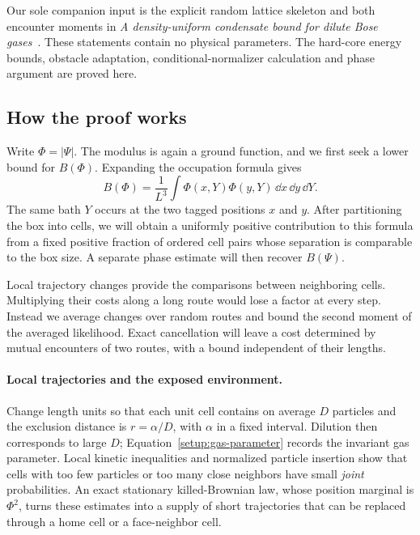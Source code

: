 Our sole companion input is the explicit random lattice skeleton and both
encounter moments in \emph{A density-uniform condensate bound for dilute
Bose gases}~\cite[Section~8.1, pp.~22--24; Lemma~8.1 and
Equations~(24)--(25), p.~23]{SoftCompanion}. These statements contain no
physical parameters. The hard-core energy bounds, obstacle adaptation,
conditional-normalizer calculation and phase argument are proved here.

\subsection{How the proof works}

Write $\Phi=|\Psi|$. The modulus is again a ground function, and we
first seek a lower bound for $B(\Phi)$. Expanding the occupation formula gives
\[
 B(\Phi)=\frac1{L^3}\int\Phi(x,Y)\Phi(y,Y)\,\dd x\,\dd y\,\dd Y.
\]
The same bath $Y$ occurs at the two tagged positions $x$ and $y$. After
partitioning the box into cells, we will obtain a uniformly positive
contribution to this formula from a fixed
positive fraction of ordered cell pairs whose separation is comparable to
the box size. A separate phase estimate will then recover $B(\Psi)$.

Local trajectory changes provide the comparisons between neighboring
cells. Multiplying their costs along a long route would lose a factor at
every step. Instead we average changes over random routes and bound the
second moment of the averaged likelihood. Exact cancellation will leave a
cost determined by mutual encounters of two routes, with a bound independent
of their lengths.

\paragraph{Local trajectories and the exposed environment.}
Change length units so that each unit cell contains on average $D$
particles and the exclusion distance is $r=\alpha/D$, with $\alpha$ in
a fixed interval. Dilution then corresponds to large $D$;
Equation~\eqref{setup:gas-parameter} records the invariant gas parameter.
Local kinetic inequalities and normalized particle insertion show that
cells with too few particles or too many close neighbors have small
\emph{joint} probabilities. An exact stationary killed-Brownian law,
whose position marginal is $\Phi^2$, turns these estimates into a supply
of short trajectories that can be replaced through a home cell or a
face-neighbor cell.

